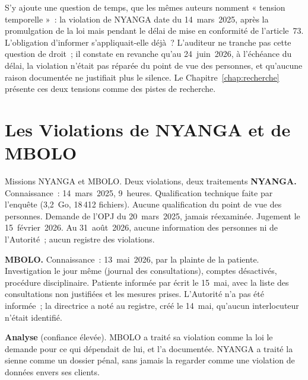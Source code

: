S'y ajoute une question de temps, que les mêmes auteurs nomment « tension
temporelle »~: la violation de NYANGA date du 14~mars~2025, après la
promulgation de la loi mais pendant le délai de mise en conformité de
l'article~73. L'obligation d'informer s'appliquait-elle déjà~? L'auditeur
ne tranche pas cette question de droit~; il constate en revanche qu'au
24~juin~2026, à l'échéance du délai, la violation n'était pas réparée du
point de vue des personnes, et qu'aucune raison documentée ne justifiait
plus le silence. Le Chapitre~\ref{chap:recherche} présente ces deux
tensions comme des pistes de recherche.

\section{Les Violations de NYANGA et de MBOLO}
\label{sec:c12-cas}

\begin{boxscenario}{Missions NYANGA et MBOLO. Deux violations, deux traitements}
\textbf{NYANGA.} Connaissance~: 14~mars~2025, 9~heures. Qualification
technique faite par l'enquête (3,2~Go, 18\,412 fichiers). Aucune
qualification du point de vue des personnes. Demande de l'OPJ du
20~mars~2025, jamais réexaminée. Jugement le 15~février~2026. Au
31~août~2026, aucune information des personnes ni de l'Autorité~; aucun
registre des violations.

\textbf{MBOLO.} Connaissance~: 13~mai~2026, par la plainte de la patiente.
Investigation le jour même (journal des consultations), comptes désactivés,
procédure disciplinaire. Patiente informée par écrit le 15~mai, avec la
liste des consultations non justifiées et les mesures prises. L'Autorité
n'a pas été informée~; la directrice a noté au registre, créé le 14~mai,
qu'aucun interlocuteur n'était identifié.

\textbf{Analyse} (confiance élevée). MBOLO a traité sa violation comme la
loi le demande pour ce qui dépendait de lui, et l'a documentée. NYANGA a
traité la sienne comme un dossier pénal, sans jamais la regarder comme une
violation de données envers ses clients.
\end{boxscenario}


